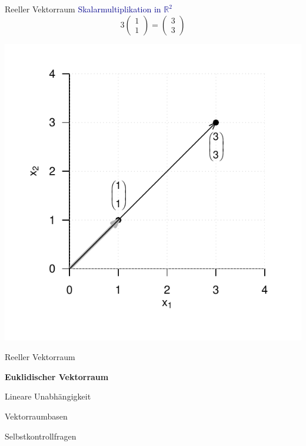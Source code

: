 \documentclass[
  8pt,
  ignorenonframetext,
]{beamer}
\begin{document}
\begin{frame}{Reeller Vektorraum}
\protect\hypertarget{reeller-vektorraum-8}{}
\textcolor{darkblue}{Skalarmultiplikation in $\mathbb{R}^2$}
\vspace{2mm} \small \begin{equation}
3
\begin{pmatrix}
1 \\ 1
\end{pmatrix}
=
\begin{pmatrix}
3 \\ 3
\end{pmatrix}
\end{equation} \vspace{-2mm}

\begin{center}\includegraphics[width=0.5\linewidth]{2_Abbildungen/mvda_2_skalarmultiplikation_R2} \end{center}
\end{frame}

\begin{frame}{}
\protect\hypertarget{section-5}{}
\large
\vfill

Reeller Vektorraum

\textbf{Euklidischer Vektorraum}

Lineare Unabhängigkeit

Vektorraumbasen

Selbstkontrollfragen \vfill
\end{frame}
\end{document}
